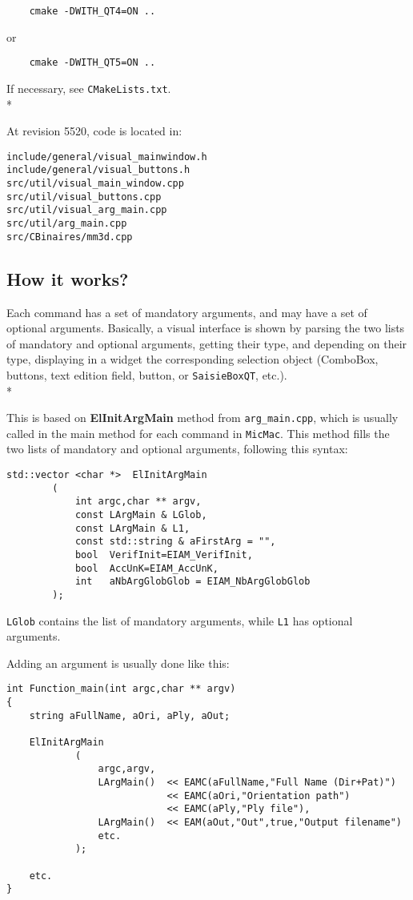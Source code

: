 \begin{verbatim}
    cmake -DWITH_QT4=ON ..
\end{verbatim}
 or
\begin{verbatim}
    cmake -DWITH_QT5=ON ..
\end{verbatim}

If necessary, see {\tt CMakeLists.txt}.\\*

At revision 5520, code is located in:
\begin{verbatim}
include/general/visual_mainwindow.h
include/general/visual_buttons.h
src/util/visual_main_window.cpp
src/util/visual_buttons.cpp
src/util/visual_arg_main.cpp
src/util/arg_main.cpp
src/CBinaires/mm3d.cpp
\end{verbatim}

\subsection{How it works?}

Each command has a set of mandatory arguments, and may have a set of optional arguments. Basically, a visual interface is shown by parsing the two lists of mandatory and optional arguments, getting their type, and depending on their type, displaying in a widget the corresponding selection object (ComboBox, buttons, text edition field, button, or {\tt SaisieBoxQT}, etc.).\\*

This is based on \textbf{ElInitArgMain} method from {\tt arg\_main.cpp}, which is usually called in the main method for each command in {\tt MicMac}. This method fills the two lists of mandatory and optional arguments, following this syntax:

\begin{verbatim}
std::vector <char *>  ElInitArgMain
        (
            int argc,char ** argv,
            const LArgMain & LGlob,
            const LArgMain & L1,
            const std::string & aFirstArg = "",
            bool  VerifInit=EIAM_VerifInit,
            bool  AccUnK=EIAM_AccUnK,
            int   aNbArgGlobGlob = EIAM_NbArgGlobGlob
        );
\end{verbatim}

 {\tt LGlob} contains the list of mandatory arguments, while  {\tt L1} has optional arguments.

Adding an argument is usually done like this: 

\begin{verbatim}
int Function_main(int argc,char ** argv)
{
    string aFullName, aOri, aPly, aOut;

    ElInitArgMain
            (
                argc,argv,
                LArgMain()  << EAMC(aFullName,"Full Name (Dir+Pat)")
                            << EAMC(aOri,"Orientation path")
                            << EAMC(aPly,"Ply file"),
                LArgMain()  << EAM(aOut,"Out",true,"Output filename")
                etc.
            );
            
    etc.
}
\end{verbatim}


